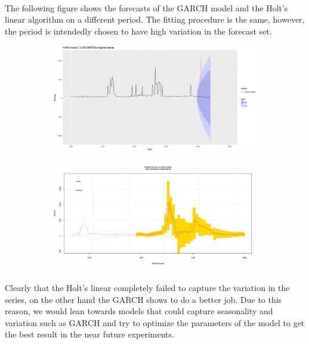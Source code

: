 \documentclass[12pt]{article}
\begin{document}
\paragraph{}
The following figure shows the forecasts of the GARCH model and the Holt's linear algorithm on a different period. The fitting procedure is the same, however, the period is intendedly chosen to have high variation in the forecast set.  
\begin{figure}[H]
  \centering
  \begin{subfigure}[b]{1\linewidth}
    \includegraphics[width=\linewidth]{figure29-1.png}
  \end{subfigure}
  \begin{subfigure}[b]{1\linewidth}
    \includegraphics[width=\linewidth]{figure29-2.png}
  \end{subfigure}
  \label{fig:figure30}
\end{figure}
\paragraph{}
Clearly that the Holt's linear completely failed to capture the variation in the series, on the other hand the GARCH shows to do a better job. Due to this reason, we would lean towards models that could capture seasonality and variation such as GARCH and try to optimize the parameters of the model to get the best result in the near future experiments.
\end{document}
